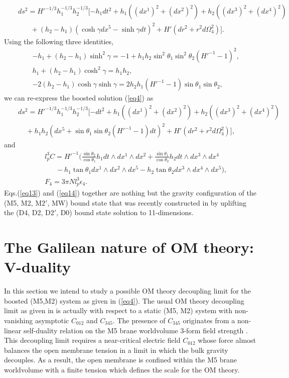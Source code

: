 \documentclass[a4paper,12pt]{article}
\newcommand{\sect}[1]{\setcounter{equation}{0}\section{#1}}
\begin{document}
\begin{eqnarray}
\label{eq9}
&& ds^2 = H'^{-1/3}h_1^{-1/3}h_2^{-1/3}[-h_1 dt^2 +h_1((dx^1)^2 +(dx^2)^2)
   +h_2((dx^3)^2 +(dx^4)^2) \nonumber \\
&&~~~~~~~~ +(h_2-h_1)(\cosh\gamma dx^5 -\sinh\gamma dt)^2 +H'(dr^2 
   +r^2 d\Omega_4^2)].
\end{eqnarray}
Using the following three identities,
\begin{eqnarray}
\label{eq10}
&& -h_1 + (h_2-h_1) \sinh^2\gamma = -1 +h_1h_2 \sin^2\theta_1\sin^2\theta_2
   (H'^{-1}-1)^2,\nonumber\\
&&h_1 +(h_2-h_1)\cosh^2\gamma = h_1h_2,\nonumber\\
&&-2(h_2-h_1)\cosh\gamma\sinh\gamma = 2h_2h_1(H'^{-1}-1)\sin\theta_1
  \sin\theta_2,
\end{eqnarray}
 we can re-express the boosted 
solution (\ref{eq4}) as
\begin{eqnarray}
\label{eq13}
&& ds^2 = H'^{-1/3}h_1^{-1/3}h_2^{-1/3}[-dt^2 +h_1((dx^1)^2 +(dx^2)^2)
   +h_2((dx^3)^2 +(dx^4)^2) \nonumber \\
&& ~~~~~+ h_1h_2(dx^5 +\sin\theta_1\sin\theta_2(H'^{-1}-1)dt)^2
    +H'(dr^2 +r^2d\Omega_4^2)],
\end{eqnarray}
and
\begin{eqnarray}
\label{eq14}
&& l_p^3 C = H'^{-1}(\frac{\sin\theta_2}{\cos\theta_1}h_1 dt\wedge dx^1
  \wedge dx^2+\frac{\sin\theta_1}{\cos\theta_2}h_2 dt\wedge dx^3 \wedge dx^4
    \nonumber \\
&&~~~~~~~ -h_1\tan\theta_1dx^1\wedge dx^2 \wedge dx^5 
  -h_2\tan\theta_2dx^3 \wedge dx^4
   \wedge dx^5),\nonumber\\
&& F_4 =  3\pi N l_p^3\epsilon_4.
\end{eqnarray}
Eqs.(\ref{eq13}) and (\ref{eq14}) together are nothing but the gravity
 configuration of the (M5, M2, M$2'$, MW) bound state that was recently
 constructed in \cite{Berg3} by uplifting
the (D4, D2, D$2'$, D0) bound state solution  \cite{Myer,HO} to
 11-dimensions.



 
\sect{The Galilean nature of OM theory: V-duality}

In this section we intend to study a possible OM theory decoupling limit
 for the boosted (M5,M2) system  as given in (\ref{eq4}). 
The usual OM theory decoupling limit as given in \cite{Gop2,Berg2} 
is actually with respect to a static (M5, M2) system with non-vanishing
asymptotic $C_{012}$ and $C_{345}$. The presence of $C_{345}$ originates
 from a non-linear self-duality relation on the M5 brane worldvolume 
3-form field strength \cite{Perry,Howe}. This decoupling limit requires 
a near-critical
 electric field $C_{012}$ whose force almost balances the open membrane
 tension in a limit in which the bulk gravity decouples. As a result,
 the open membrane is confined within the M5 brane worldvolume with a
 finite tension which defines the scale for the OM theory.
\end{document}
